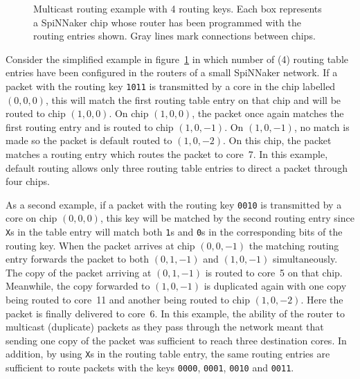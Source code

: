 			\begin{figure}
				\center
				
				\caption[Multicast routing example.]%
				{Multicast routing example with \SI{4}{\bit} routing keys. Each
				box represents a SpiNNaker chip whose router has been programmed with
				the routing entries shown. Gray lines mark connections between chips.}
				\label{fig:routing-example}
			\end{figure}
			
			Consider the simplified example in figure~\ref{fig:routing-example} in
			which number of (\SI{4}{\bit}) routing table entries have been configured
			in the routers of a small SpiNNaker network. If a packet with the routing
			key \texttt{1011} is transmitted by a core in the chip labelled $(0, 0,
			0)$, this will match the first routing table entry on that chip and will
			be routed to chip $(1, 0, 0)$. On chip $(1, 0, 0)$, the packet once again
			matches the first routing entry and is routed to chip $(1, 0, -1)$. On
			$(1, 0, -1)$, no match is made so the packet is default routed to $(1, 0,
			-2)$. On this chip, the packet matches a routing entry which routes the
			packet to core~7. In this example, default routing allows only three
			routing table entries to direct a packet through four chips.
			
			As a second example, if a packet with the routing key \texttt{0010} is
			transmitted by a core on chip $(0, 0, 0)$, this key will be matched by
			the second routing entry since \texttt{X}s in the table entry will match
			both \texttt{1}s and \texttt{0}s in the corresponding bits of the routing
			key. When the packet arrives at chip $(0, 0, -1)$ the matching routing
			entry forwards the packet to both $(0, 1, -1)$ and $(1, 0, -1)$
			simultaneously. The copy of the packet arriving at $(0, 1, -1)$ is routed
			to core~5 on that chip.  Meanwhile, the copy forwarded to $(1, 0, -1)$ is
			duplicated again with one copy being routed to core~11 and another being
			routed to chip $(1, 0, -2)$. Here the packet is finally delivered to
			core~6. In this example, the ability of the router to multicast
			(duplicate) packets as they pass through the network meant that sending
			one copy of the packet was sufficient to reach three destination cores.
			In addition, by using \texttt{X}s in the routing table entry, the same
			routing entries are sufficient to route packets with the keys
			\texttt{0000}, \texttt{0001}, \texttt{0010} and \texttt{0011}.
			
